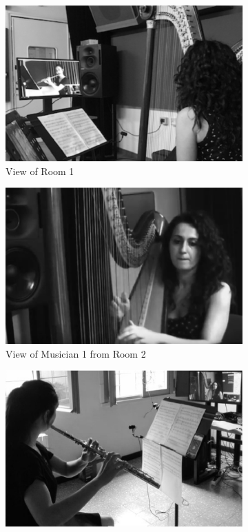 \begin{figure}[t]
	\centering
    \begin{subfigure}[t]{\columnwidth}
		\centering        
		\includegraphics[width=\textwidth]{img/as.eps}
		\caption{View of Room 1}
		\label{subfig:as}
	\end{subfigure}
    \begin{subfigure}[t]{\columnwidth}
	\centering        
	\includegraphics[width=\textwidth]{img/av.eps}
	\caption{View of Musician 1 from Room 2}
	\label{subfig:av}
	\end{subfigure}
    \begin{subfigure}[t]{\columnwidth}
	\centering        
	\includegraphics[width=\textwidth]{img/fs.eps}

\end{subfigure}
\end{figure}
